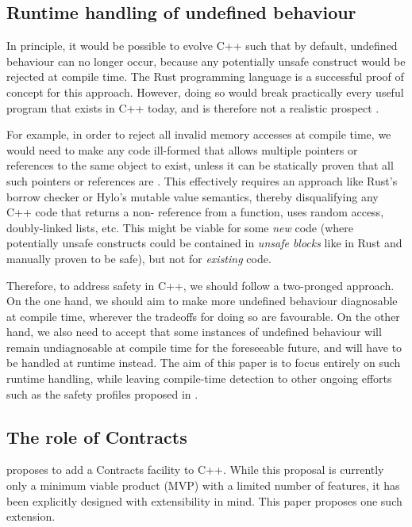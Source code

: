 \subsection{Runtime handling of undefined behaviour}

In principle, it would be possible to evolve C++ such that by default, undefined behaviour can no longer occur, because any  potentially unsafe construct would be rejected at compile time. The Rust programming language is a successful proof of concept for this approach. However, doing so would break practically every useful program that exists in C++ today, and is therefore not a realistic prospect \cite{Doumler2023}.

For example, in order to reject all invalid memory accesses at compile time, we would need to make any code ill-formed that allows multiple pointers or references to the same object to exist, unless it can be statically proven that all such pointers or references are . This effectively requires an approach like Rust's borrow checker or Hylo's mutable value semantics, thereby disqualifying any C++ code that returns a non- reference from a function, uses random access, doubly-linked lists, etc. This might be viable for some \emph{new} code (where potentially unsafe constructs could be contained in \emph{unsafe blocks} like in Rust and manually proven to be safe), but not for \emph{existing} code. 

Therefore, to address safety in C++, we should follow a two-pronged approach. On the one hand, we should aim to make more undefined behaviour diagnosable at compile time, wherever the tradeoffs for doing so are favourable. On the other hand, we also need to accept that some instances of undefined behaviour will remain undiagnosable at compile time for the foreseeable future, and will have to be handled at runtime instead. The aim of this paper is to focus entirely on such runtime handling, while leaving compile-time detection to other ongoing efforts such as the safety profiles proposed in \cite{P2687R0}.

\subsection{The role of Contracts}

\cite{P2900R7} proposes to add a Contracts facility to C++. While this proposal is currently only a minimum viable product (MVP) with a limited number of features, it has been explicitly designed with extensibility in mind. This paper proposes one such extension.

